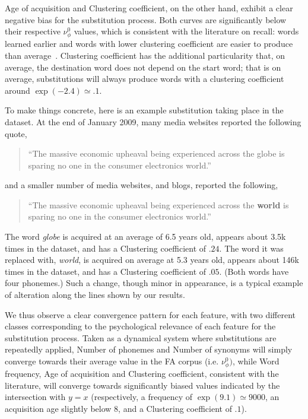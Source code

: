 Age of acquisition and Clustering coefficient, on the other hand, exhibit a clear negative bias for the substitution process. Both curves are significantly below their respective $\nu_{\phi}^0$ values, which is consistent with the literature on recall: words learned earlier and words with lower clustering coefficient are easier to produce than average~\citep{nelson2013activation,Zevin02}.
Clustering coefficient has the additional particularity that, on average, the destination word does not depend on the start word; that is on average, substitutions will always produce words with a clustering coefficient around $\exp(-2.4) \simeq .1$.

To make things concrete, here is an example substitution taking place in the dataset.
At the end of January 2009, many media websites reported the following quote,

\begin{quote}
    ``The massive economic upheaval being experienced across the globe is sparing no one in the consumer electronics world.''
\end{quote}
and a smaller number of media websites, and blogs, reported the following,
\begin{quote}
    ``The massive economic upheaval being experienced across the \textbf{world} is sparing no one in the consumer electronics world.''
\end{quote}
The word \emph{globe} is acquired at an average of 6.5 years old, appears about 3.5k times in the dataset, and has a Clustering coefficient of $.24$.
The word it was replaced with, \emph{world}, is acquired on average at 5.3 years old, appears about 146k times in the dataset, and has a Clustering coefficient of $.05$. (Both words have four phonemes.)
Such a change, though minor in appearance, is a typical example of alteration along the lines shown by our results.


\medskip
We thus observe a clear convergence pattern for each feature, with two different classes corresponding to the psychological relevance of each feature for the substitution process.
Taken as a dynamical system where substitutions are repeatedly applied, Number of phonemes and Number of synonyms will simply converge towards their average value in the FA corpus (i.e. $\nu_{\phi}^0)$, while Word frequency, Age of acquisition and Clustering coefficient, consistent with the literature, will converge towards significantly biased values indicated by the intersection with $y = x$ (respectively, a frequency of $\exp(9.1) \simeq 9000$, an acquisition age slightly below 8, and a Clustering coefficient of $.1$).

